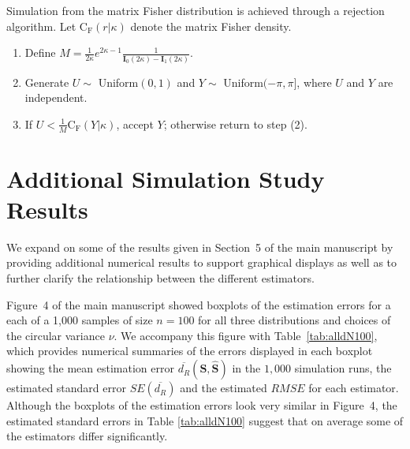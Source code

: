 \documentclass[12pt]{article}
\newcommand{\Rdist}{{d_R}}
\begin{document}
Simulation from the matrix Fisher distribution is achieved through a rejection algorithm.  Let  $\mathrm{C_F}(r|\kappa)$ denote the matrix Fisher density.%

\begin{enumerate}
\item Define $M=\frac{1}{2\kappa}e^{2\kappa - 1}\frac{1}{\mathbf{I}_0(2\kappa)-\mathbf{I}_1(2\kappa)}.$
\item Generate $U\sim$ Uniform$(0,1)$ and $Y\sim$ Uniform$(-\pi,\pi]$, where $U$ and $Y$ are independent.
\item If $U<\frac{1}{M}\mathrm{C_F}(Y|\kappa)$, accept $Y$; otherwise return to step (2).
\end{enumerate}

%


\section{Additional Simulation Study Results}
\label{sec:appendix3}
We expand on some of the results given in Section~5 of the main manuscript by providing additional numerical results to support graphical displays as well as to further clarify the relationship between the different estimators.

\noindent Figure~4 of the main manuscript showed boxplots of the estimation errors for a each of a 1,000 samples of size $n=100$ for all three distributions and choices of the circular variance $\nu$.  We accompany this figure with Table~\ref{tab:alldN100}, which provides numerical summaries of the errors displayed in each boxplot showing the mean estimation error $\overline{\Rdist}(\bm{S}, \widehat{\bm{S}})$ in the $1,000$ simulation runs, the estimated standard error $SE(\overline{\Rdist})$ and the estimated $RMSE$ for each estimator.  Although the boxplots of the estimation errors look very similar in Figure~4, the estimated standard errors in Table \ref{tab:alldN100} suggest that on average some of the estimators differ significantly.  
\end{document}
